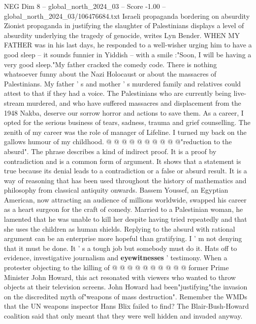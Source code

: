 \begin{textsample}{NEG Dim 8 – global\_north\_2024\_03 – Score -1.00 – global\_north\_2024\_03/106476684.txt}  \label{ex:f8_neg_440}
Israeli propaganda bordering on absurdity Zionist propaganda in justifying the slaughter of Palestinians displays a level of absurdity underlying the tragedy of genocide, writes Lyn Bender.
WHEN MY FATHER was in his last days, he responded to a well-wisher urging him to have a good sleep -- it sounds funnier in Yiddish -- with a smile :"Soon, I will be having a very good sleep."My father cracked the comedy code.
There is nothing whatsoever funny about the Nazi Holocaust or about the massacres of Palestinians.
My father ' s and mother ' s murdered family and relatives could attest to that if they had a voice.
The Palestinians who are currently being live-stream murdered, and who have suffered massacres and displacement from the 1948 Nakba, deserve our sorrow horror and actions to save them.
As a career, I opted for the serious business of tears, sadness, trauma and grief counselling.
The zenith of my career was the role of manager of Lifeline.
I turned my back on the gallows humour of my childhood. @ @ @ @ @ @ @ @ @ @"reduction to the absurd".
The phrase describes a kind of indirect proof.
It is a proof by contradiction and is a common form of argument.
It shows that a statement is true because its denial leads to a contradiction or a false or absurd result.
It is a way of reasoning that has been used throughout the history of mathematics and philosophy from classical antiquity onwards.
Bassem Youssef, an Egyptian American, now attracting an audience of millions worldwide, swapped his career as a heart surgeon for the craft of comedy.
Married to a Palestinian woman, he lamented that he was unable to kill her despite having tried repeatedly and that she uses the children as human shields.
Replying to the absurd with rational argument can be an enterprise more hopeful than gratifying.
I ' m not denying that it must be done.
It ' s a tough job but somebody must do it.
Hats off to evidence, investigative journalism and \textbf{eyewitnesses} ' testimony.
When a protester objecting to the killing of @ @ @ @ @ @ @ @ @ @ former Prime Minister John Howard, this act resonated with viewers who wanted to throw objects at their television screens.
John Howard had been"justifying"the invasion on the discredited myth of"weapons of mass destruction".
Remember the WMDs that the UN weapons inspector Hans Blix failed to find?
The Blair-Bush-Howard coalition said that only meant that they were well hidden and invaded anyway.

\end{textsample}
